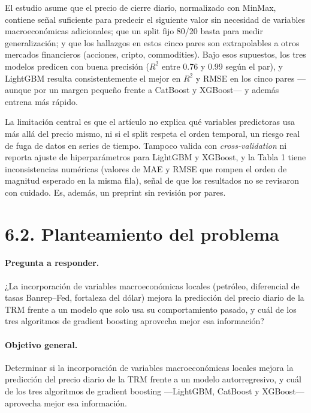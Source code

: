 \documentclass[11pt,letterpaper]{article}
\begin{document}
  El estudio asume que el precio de cierre diario, normalizado con MinMax, contiene señal suficiente para predecir el siguiente valor sin necesidad de variables macroeconómicas adicionales; que un split fijo 80/20 basta para medir generalización; y que los hallazgos en estos cinco pares son extrapolables a otros mercados financieros (acciones, cripto, commodities). Bajo esos supuestos, los tres modelos predicen con buena precisión ($R^2$ entre 0.76 y 0.99 según el par), y LightGBM resulta consistentemente el mejor en $R^2$ y RMSE en los cinco pares ---aunque por un margen pequeño frente a CatBoost y XGBoost--- y además entrena más rápido.

  La limitación central es que el artículo no explica qué variables predictoras usa más allá del precio mismo, ni si el split respeta el orden temporal, un riesgo real de fuga de datos en series de tiempo. Tampoco valida con \textit{cross-validation} ni reporta ajuste de hiperparámetros para LightGBM y XGBoost, y la Tabla 1 tiene inconsistencias numéricas (valores de MAE y RMSE que rompen el orden de magnitud esperado en la misma fila), señal de que los resultados no se revisaron con cuidado. Es, además, un preprint sin revisión por pares.

  \section*{6.2. Planteamiento del problema}

  \paragraph{Pregunta a responder.} ¿La incorporación de variables macroeconómicas locales (petróleo, diferencial de tasas Banrep--Fed, fortaleza del dólar) mejora la predicción del precio diario de la TRM frente a un modelo que solo usa su comportamiento pasado, y cuál de los tres algoritmos de gradient boosting aprovecha mejor esa información?

  \paragraph{Objetivo general.} Determinar si la incorporación de variables macroeconómicas locales mejora la predicción del precio diario de la TRM frente a un modelo autorregresivo, y cuál de los tres algoritmos de gradient boosting ---LightGBM, CatBoost y XGBoost--- aprovecha mejor esa información.
\end{document}
